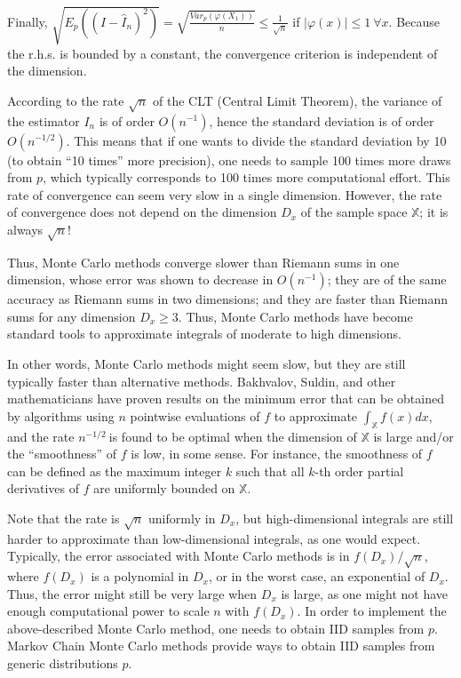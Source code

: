 \documentclass[11pt,a4paper]{article}
\begin{document}
Finally,
\(\sqrt{E_{p}\left( \left( I - {\widehat{I}}_{n} \right)^{2} \right)} = \sqrt{\frac{Var_{p}\left( \varphi\left( X_{1} \right) \right)}{n}} \leq \frac{1}{\sqrt{n}}\)
if \(\left| \varphi(x) \right| \leq 1\ \forall x\). Because the r.h.s.
is bounded by a constant, the convergence criterion is independent of
the dimension.

According to the rate \(\sqrt{n}\) of the CLT (Central Limit Theorem),
the variance of the estimator \(I_{n}\) is of order
\(O\left( n^{- 1} \right)\), hence the standard deviation is of order
\(O\left( n^{- 1/2} \right)\). This means that if one wants to divide
the standard deviation by 10 (to obtain ``10 times'' more precision),
one needs to sample 100 times more draws from \(p\), which typically
corresponds to 100 times more computational effort. This rate of
convergence can seem very slow in a single dimension. However, the rate
of convergence does not depend on the dimension \(D_{x}\) of the sample
space \(\mathbb{X}\); it is always \(\sqrt{n}\)!

Thus, Monte Carlo methods converge slower than Riemann sums in one
dimension, whose error was shown to decrease in \(O(n^{- 1})\); they are
of the same accuracy as Riemann sums in two dimensions; and they are
faster than Riemann sums for any dimension \(D_{x} \geq 3\). Thus, Monte
Carlo methods have become standard tools to approximate integrals of
moderate to high dimensions.

In other words, Monte Carlo methods might seem slow, but they are still
typically faster than alternative methods. Bakhvalov, Suldin, and other
mathematicians have proven results on the minimum error that can be
obtained by algorithms using \(n\) pointwise evaluations of \(f\) to
approximate \(\int_{\mathbb{X}}^{}{f(x)}dx\), and the rate
\(n^{- 1/2}\ \)is found to be optimal when the dimension of
\(\mathbb{X}\) is large and/or the ``smoothness'' of \(f\) is low, in
some sense. For instance, the smoothness of \(f\) can be defined as the
maximum integer \(k\) such that all \(k\)-th order partial derivatives
of \(f\) are uniformly bounded on \(\mathbb{X}\).

Note that the rate is \(\sqrt{n}\) uniformly in \(D_{x}\), but
high-dimensional integrals are still harder to approximate than
low-dimensional integrals, as one would expect. Typically, the error
associated with Monte Carlo methods is in \(f(D_{x})/\sqrt{n}\), where
\(f(D_{x})\) is a polynomial in \(D_{x}\), or in the worst case, an
exponential of \(D_{x}\). Thus, the error might still be very large when
\(D_{x}\) is large, as one might not have enough computational power to
scale \(n\) with \(f(D_{x})\). In order to implement the above-described
Monte Carlo method, one needs to obtain IID samples from \(p\). Markov
Chain Monte Carlo methods provide ways to obtain IID samples from
generic distributions \(p\).
\end{document}
